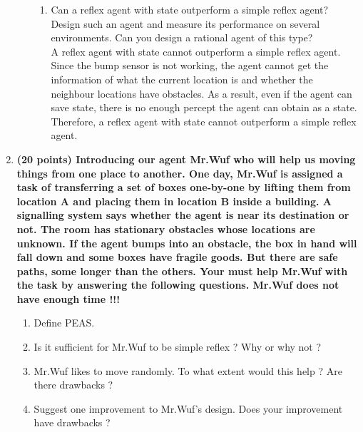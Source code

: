 \documentclass{article}%
\begin{document}
\begin{enumerate}
\begin{enumerate}
\begin{enumerate}
	\item Can a reflex agent with state outperform a simple reflex agent? Design such an agent and measure its performance on several environments. Can you design a rational agent of this type? \\
	A reflex agent with state cannot outperform a simple reflex agent. Since the bump sensor is not working, the agent cannot get the information of what the current location is and whether the neighbour locations have obstacles. As a result, even if the agent can save state, there is no enough percept the agent can obtain as a state. Therefore, a reflex agent with state cannot outperform a simple reflex agent.
	\end{enumerate}

\end{enumerate}


\item \textbf{(20 points) Introducing our agent Mr.Wuf who will help us moving things from one place to another. One day, Mr.Wuf is assigned a task of transferring a set of boxes one-by-one by lifting them from location A and placing them in location B inside a building. A signalling system says whether the agent is near its destination or not. The room has stationary obstacles whose locations are unknown. If the agent bumps into an obstacle, the box in hand will fall down and some boxes have fragile goods. But there are safe paths, some longer than the others. Your must help Mr.Wuf with the task by answering the following questions. Mr.Wuf does not have enough time !!!}

	\begin{enumerate}
	\item Define PEAS.
	\item Is it sufficient for Mr.Wuf to be simple reflex ? Why or why not ?
	\item Mr.Wuf likes to move randomly. To what extent would this help ? Are there drawbacks ?
	\item Suggest one improvement to Mr.Wuf's design. Does your improvement have drawbacks ?
	\end{enumerate}
	

\end{enumerate}
\end{document}
